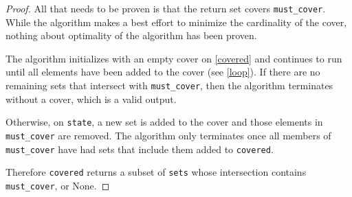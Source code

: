 \documentclass{article}
\begin{document}
\begin{proof} 
    All that needs to be proven is that the return set covers \texttt{must\_cover}.
    While the algorithm makes a best effort to minimize the cardinality of the cover,
    nothing about optimality of the algorithm has been proven.

    The algorithm initializes with an empty cover on \ref{covered} and 
    continues to run until all elements have been added to the cover (see \ref{loop}).
    If there are no remaining sets that intersect with \texttt{must\_cover},
    then the algorithm terminates without a cover, which is a valid output.

    Otherwise, on \texttt{state}, a new set is added to the cover and those elements in \texttt{must\_cover} are removed.
    The algorithm only terminates once all members of \texttt{must\_cover} have had sets that include them added to \texttt{covered}.

    Therefore \texttt{covered} returns a subset of \texttt{sets} 
    whose intersection contains \texttt{must\_cover}, or None.

\end{proof}
\end{document}
